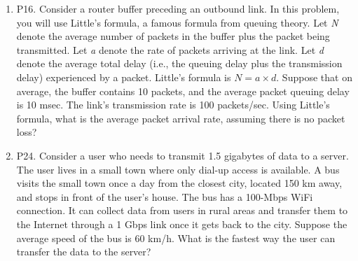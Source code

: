\documentclass[12pt]{article}
\begin{document}
\begin{enumerate}
\item P16.  Consider a router buffer preceding an outbound link. In this problem, you will use Little’s formula, a famous formula from queuing theory. Let \textit{N} denote the average number of packets in the buffer plus the packet being transmitted. Let \textit{a} denote the rate of packets arriving at the link. Let \textit{d} denote the average total delay (i.e., the queuing delay plus the transmission delay) experienced by a packet. Little’s formula is \(N  =  a \times d\). Suppose that on average, the buffer contains 10 packets, and the average packet queuing delay is 10 msec. The link’s transmission rate is 100 packets/sec. Using Little’s formula, what is the average packet arrival rate, assuming there is no packet loss?

\item P24.  Consider a user who needs to transmit 1.5 gigabytes of data to a server. The user lives in a small town where only dial-up access is available. A bus visits the small town once a day from the closest city, located 150 km away, and stops in front of the user’s house. The bus has a 100-Mbps WiFi connection. It can collect data from users in rural areas and transfer them to the Internet through a 1 Gbps link once it gets back to the city. Suppose the average speed of the bus is 60 km/h. What is the fastest way the user can transfer the data to the server?


\end{enumerate}
\end{document}
